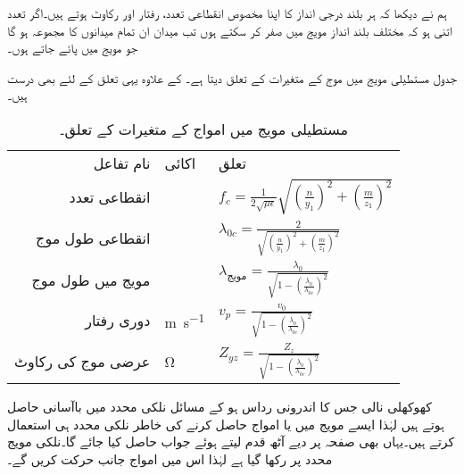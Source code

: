 ہم نے دیکھا کہ ہر بلند درجی انداز کا اپنا مخصوص انقطاعی تعدد، رفتار اور رکاوٹ ہوتے ہیں۔اگر تعدد اتنی ہو کہ مختلف بلند انداز مویج میں صفر کر سکتے ہوں تب میدان ان تمام میدانوں کا مجموعہ ہو گا جو مویج میں پائے جاتے ہوں۔ 


جدول  مستطیلی مویج میں  موج کے متغیرات کے تعلق دیتا ہے۔ کے علاوہ یہی تعلق  کے لئے بھی درست ہیں۔

\begin{table}[h!]
\caption{مستطیلی مویج میں  امواج کے متغیرات کے تعلق۔}
\centering
\begin{tabular}{rll}
نام تفاعل & اکائی& تعلق\\
انقطاعی تعدد & {\si{\hertz}} & $f_c=\frac{1}{2\sqrt{\mu \epsilon}}\sqrt{\left(\frac{n}{y_1}\right)^2+\left(\frac{m}{z_1}\right)^2}$\\
انقطاعی طول موج &  {\si{\meter}}& $ \lambda_{0c}=\frac{2}{\sqrt{\left(\frac{n}{y_1}\right)^2+\left(\frac{m}{z_1}\right)^2}}$\\
مویج میں طول موج& {\si{\meter}} & $\lambda_{\text{مویج}}=\frac{\lambda_0}{\sqrt{1-\left(\frac{\lambda_0}{\lambda_{0c}}\right)^2}}$\\
دوری رفتار & \si{\meter\per\second} & $v_p=\frac{v_0}{\sqrt{1-\left(\frac{\lambda_0}{\lambda_{0c}}\right)^2}}$\\
عرضی موج کی رکاوٹ & \si{\ohm} & $Z_{yz}=\frac{Z_z}{\sqrt{1-\left(\frac{\lambda_0}{\lambda_{0c}}\right)^2}}$
\end{tabular}
\label{جدول_مویج_مستطیلی_مویج_تعلق}
\end{table}

کھوکھلی نالی جس کا اندرونی رداس  ہو کے مسائل نلکی محدد میں باآسانی حاصل ہوتے ہیں لہٰذا ایسے مویج میں  یا  امواج حاصل کرنے کی خاطر نلکی محدد ہی استعمال کرتے ہیں۔یہاں بھی صفحہ  پر دیے آٹھ قدم  لیتے ہوئے جواب حاصل کیا جائے گا۔نلکی مویج  محدد پر رکھا گیا ہے لہٰذا اس  میں امواج  جانب حرکت کریں گے۔

